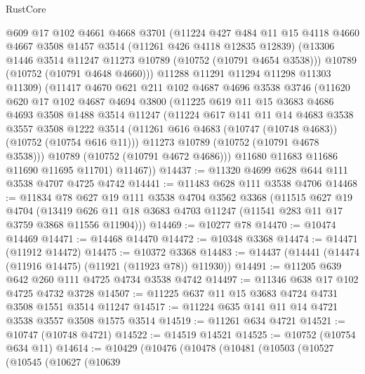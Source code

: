 \begin{lexlean}{RustCore}
\begin{coremodule}
        @609
        @17
        @102
        @4661
        @4668
        @3701
        (@11224
          @427
          @484
          @11
          @15
          @4118
          @4660
          @4667
          @3508
          @1457
          @3514
          (@11261 @426 @4118 @12835 @12839)
          (@13306 @1446 @3514 @11247 @11273 @10789 (@10752 (@10791 @4654 @3538)))
          @10789
          (@10752 (@10791 @4648 @4660)))
        @11288
        @11291
        @11294
        @11298
        @11303
        @11309)
      (@11417
        @4670
        @621
        @211
        @102
        @4687
        @4696
        @3538
        @3746
        (@11620
          @620
          @17
          @102
          @4687
          @4694
          @3800
          (@11225
            @619
            @11
            @15
            @3683
            @4686
            @4693
            @3508
            @1488
            @3514
            @11247
            (@11224
              @617
              @141
              @11
              @14
              @4683
              @3538
              @3557
              @3508
              @1222
              @3514
              (@11261 @616 @4683 (@10747 (@10748 @4683)) (@10752 (@10754 @616 @11)))
              @11273
              @10789
              (@10752 (@10791 @4678 @3538)))
            @10789
            (@10752 (@10791 @4672 @4686)))
          @11680
          @11683
          @11686
          @11690
          @11695
          @11701)
        @11467))
@14437 := @11320 @4699 @628 @644 @111 @3538 @4707 @4725 @4742
@14441 := @11483 @628 @111 @3538 @4706
@14468 := @11834
    @78
    @627
    @19
    @111
    @3538
    @4704
    @3562
    @3368
    (@11515
      @627
      @19
      @4704
      (@13419 @626 @11 @18 @3683 @4703 @11247 (@11541 @283 @11 @17 @3759 @3868 @11556 @11904)))
@14469 := @10277 @78
@14470 := @10474 @14469
@14471 := @14468 @14470
@14472 := @10348 @3368
@14474 := @14471 (@11912 @14472)
@14475 := @10372 @3368
@14483 := @14437 (@14441 (@14474 (@11916 @14475) (@11921 (@11923 @78)) @11930))
@14491 := @11205 @639 @642 @260 @111 @4725 @4734 @3538 @4742
@14497 := @11346 @638 @17 @102 @4725 @4732 @3728
@14507 := @11225 @637 @11 @15 @3683 @4724 @4731 @3508 @1551 @3514 @11247
@14517 := @11224 @635 @141 @11 @14 @4721 @3538 @3557 @3508 @1575 @3514
@14519 := @11261 @634 @4721
@14521 := @10747 (@10748 @4721)
@14522 := @14519 @14521
@14525 := @10752 (@10754 @634 @11)
@14614 := @10429
    (@10476
      (@10478
        (@10481
          (@10503
            (@10527
              (@10545
                (@10627
                  (@10639

\end{coremodule}
\end{lexlean}
